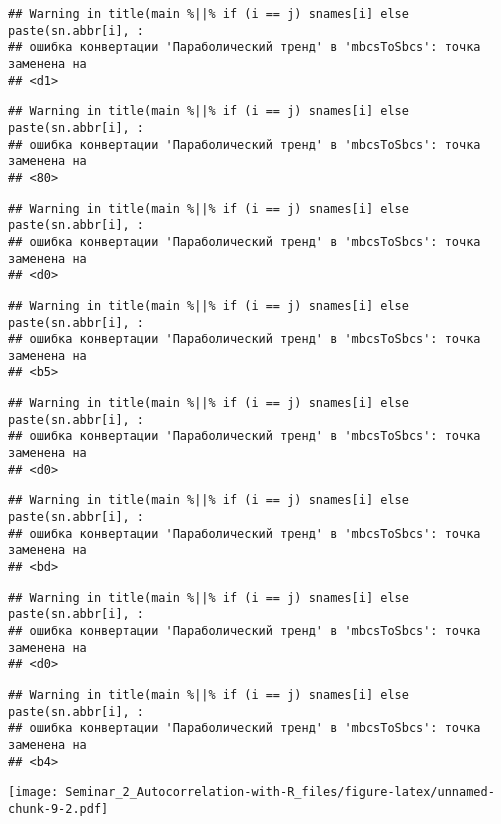 \documentclass[
]{article}
\begin{document}
\begin{verbatim}
## Warning in title(main %||% if (i == j) snames[i] else paste(sn.abbr[i], :
## ошибка конвертации 'Параболический тренд' в 'mbcsToSbcs': точка заменена на
## <d1>
\end{verbatim}

\begin{verbatim}
## Warning in title(main %||% if (i == j) snames[i] else paste(sn.abbr[i], :
## ошибка конвертации 'Параболический тренд' в 'mbcsToSbcs': точка заменена на
## <80>
\end{verbatim}

\begin{verbatim}
## Warning in title(main %||% if (i == j) snames[i] else paste(sn.abbr[i], :
## ошибка конвертации 'Параболический тренд' в 'mbcsToSbcs': точка заменена на
## <d0>
\end{verbatim}

\begin{verbatim}
## Warning in title(main %||% if (i == j) snames[i] else paste(sn.abbr[i], :
## ошибка конвертации 'Параболический тренд' в 'mbcsToSbcs': точка заменена на
## <b5>
\end{verbatim}

\begin{verbatim}
## Warning in title(main %||% if (i == j) snames[i] else paste(sn.abbr[i], :
## ошибка конвертации 'Параболический тренд' в 'mbcsToSbcs': точка заменена на
## <d0>
\end{verbatim}

\begin{verbatim}
## Warning in title(main %||% if (i == j) snames[i] else paste(sn.abbr[i], :
## ошибка конвертации 'Параболический тренд' в 'mbcsToSbcs': точка заменена на
## <bd>
\end{verbatim}

\begin{verbatim}
## Warning in title(main %||% if (i == j) snames[i] else paste(sn.abbr[i], :
## ошибка конвертации 'Параболический тренд' в 'mbcsToSbcs': точка заменена на
## <d0>
\end{verbatim}

\begin{verbatim}
## Warning in title(main %||% if (i == j) snames[i] else paste(sn.abbr[i], :
## ошибка конвертации 'Параболический тренд' в 'mbcsToSbcs': точка заменена на
## <b4>
\end{verbatim}

\texttt{[image: Seminar\_2\_Autocorrelation-with-R\_files/figure-latex/unnamed-chunk-9-2.pdf]}
\end{document}
